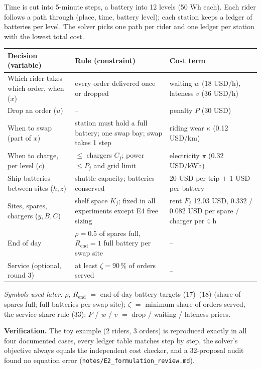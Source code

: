 \noindent Time is cut into 5-minute steps, a battery into 12 levels (50 Wh each). Each rider follows a path through (place, time, battery level); each station keeps a ledger of batteries per level. The solver picks one path per rider and one ledger per station with the lowest total cost.

\begin{center}\small
\begin{tabular}{@{}L{4.6cm}L{5.4cm}L{4.9cm}@{}}
\toprule
Decision (variable) & Rule (constraint) & Cost term \\
\midrule
Which rider takes which order, when ($x$) & every order delivered once or dropped & waiting $w$ (18 USD/h), lateness $v$ (36 USD/h) \\
Drop an order ($u$) & -- & penalty $P$ (30 USD) \\
When to swap (part of $x$) & station must hold a full battery; one swap bay; swap takes 1 step & riding wear $\kappa$ (0.12 USD/km) \\
When to charge, per level ($c$) & $\le$ chargers $C_j$; power $\le P_j$ and grid limit & electricity $\pi$ (0.32 USD/kWh) \\
Ship batteries between sites ($h, z$) & shuttle capacity; batteries conserved & 20 USD per trip $+$ 1 USD per battery \\
Sites, spares, chargers ($y, B, C$) & shelf space $K_j$; fixed in all experiments except E4 free sizing & rent $F_j$ 12.03 USD, 0.332 / 0.082 USD per spare / charger per 4 h \\
End of day & $\rho=0.5$ of spares full, $R_{\mathrm{end}}=1$ full battery per swap site & -- \\
Service (optional, round 3) & at least $\zeta = 90\,\%$ of orders served & -- \\
\bottomrule
\end{tabular}
\end{center}
\noindent\small\emph{Symbols used later:} $\rho$, $R_{\mathrm{end}}$ $=$ end-of-day battery targets (17)--(18) (share of spares full; full batteries per swap site); $\zeta$ $=$ minimum share of orders served, the service-share rule (33); $P$ / $w$ / $v$ $=$ drop / waiting / lateness prices.\normalsize

\noindent\textbf{Verification.} The toy example (2 riders, 3 orders) is reproduced exactly in all four documented cases, every ledger table matches step by step, the solver's objective always equals the independent cost checker, and a 32-proposal audit found no equation error (\texttt{notes/E2\_formulation\_review.md}).

